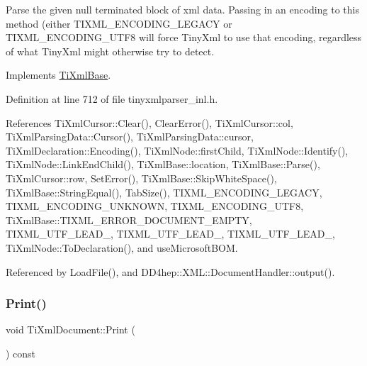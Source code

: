 Parse the given null terminated block of xml data. Passing in an encoding to this method (either T\+I\+X\+M\+L\+\_\+\+E\+N\+C\+O\+D\+I\+N\+G\+\_\+\+L\+E\+G\+A\+CY or T\+I\+X\+M\+L\+\_\+\+E\+N\+C\+O\+D\+I\+N\+G\+\_\+\+U\+T\+F8 will force Tiny\+Xml to use that encoding, regardless of what Tiny\+Xml might otherwise try to detect. 

Implements \hyperlink{class_ti_xml_base_a00e4edb0219d00a1379c856e5a1d2025}{Ti\+Xml\+Base}.



Definition at line 712 of file tinyxmlparser\+\_\+inl.\+h.



References Ti\+Xml\+Cursor\+::\+Clear(), Clear\+Error(), Ti\+Xml\+Cursor\+::col, Ti\+Xml\+Parsing\+Data\+::\+Cursor(), Ti\+Xml\+Parsing\+Data\+::cursor, Ti\+Xml\+Declaration\+::\+Encoding(), Ti\+Xml\+Node\+::first\+Child, Ti\+Xml\+Node\+::\+Identify(), Ti\+Xml\+Node\+::\+Link\+End\+Child(), Ti\+Xml\+Base\+::location, Ti\+Xml\+Base\+::\+Parse(), Ti\+Xml\+Cursor\+::row, Set\+Error(), Ti\+Xml\+Base\+::\+Skip\+White\+Space(), Ti\+Xml\+Base\+::\+String\+Equal(), Tab\+Size(), T\+I\+X\+M\+L\+\_\+\+E\+N\+C\+O\+D\+I\+N\+G\+\_\+\+L\+E\+G\+A\+CY, T\+I\+X\+M\+L\+\_\+\+E\+N\+C\+O\+D\+I\+N\+G\+\_\+\+U\+N\+K\+N\+O\+WN, T\+I\+X\+M\+L\+\_\+\+E\+N\+C\+O\+D\+I\+N\+G\+\_\+\+U\+T\+F8, Ti\+Xml\+Base\+::\+T\+I\+X\+M\+L\+\_\+\+E\+R\+R\+O\+R\+\_\+\+D\+O\+C\+U\+M\+E\+N\+T\+\_\+\+E\+M\+P\+TY, T\+I\+X\+M\+L\+\_\+\+U\+T\+F\+\_\+\+L\+E\+A\+D\+\_, T\+I\+X\+M\+L\+\_\+\+U\+T\+F\+\_\+\+L\+E\+A\+D\+\_, T\+I\+X\+M\+L\+\_\+\+U\+T\+F\+\_\+\+L\+E\+A\+D\+\_, Ti\+Xml\+Node\+::\+To\+Declaration(), and use\+Microsoft\+B\+OM.



Referenced by Load\+File(), and D\+D4hep\+::\+X\+M\+L\+::\+Document\+Handler\+::output().

\hypertarget{class_ti_xml_document_aa4e8c1498a76dcde7191c683e1220882}{}\label{class_ti_xml_document_aa4e8c1498a76dcde7191c683e1220882} 
\subsubsection{\texorpdfstring{Print()}{Print()}\hspace{0.1cm}{\footnotesize\ttfamily [1/2]}}
{\footnotesize\ttfamily void Ti\+Xml\+Document\+::\+Print (\begin{DoxyParamCaption}{ }\end{DoxyParamCaption}) const\hspace{0.3cm}{\ttfamily [inline]}}

